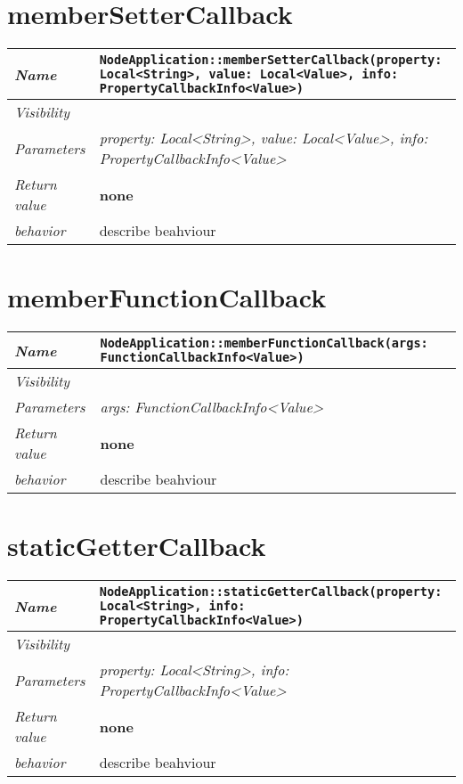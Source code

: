  \section{memberSetterCallback}
\begin{longtable}{p{3cm} @{\hskip 1cm} p{12cm}}
 \hline
\textit{Name} & \texttt{NodeApplication::memberSetterCallback(property: Local<String>, value: Local<Value>, info: PropertyCallbackInfo<Value>)}\\
\hline
 \textit{Visibility} & \\
\hline
\textit{Parameters} & \textit{property: Local<String>, value: Local<Value>, info: PropertyCallbackInfo<Value>}\\
\hline
\textit{Return value} & \textbf{none}\\
  \hline
 \textit{behavior} & describe beahviour \\
\hline
\end{longtable} \pagebreak
 \section{memberFunctionCallback}
\begin{longtable}{p{3cm} @{\hskip 1cm} p{12cm}}
 \hline
\textit{Name} & \texttt{NodeApplication::memberFunctionCallback(args: FunctionCallbackInfo<Value>)}\\
\hline
 \textit{Visibility} & \\
\hline
\textit{Parameters} & \textit{args: FunctionCallbackInfo<Value>}\\
\hline
\textit{Return value} & \textbf{none}\\
  \hline
 \textit{behavior} & describe beahviour \\
\hline
\end{longtable} \pagebreak
 \section{staticGetterCallback}
\begin{longtable}{p{3cm} @{\hskip 1cm} p{12cm}}
 \hline
\textit{Name} & \texttt{NodeApplication::staticGetterCallback(property: Local<String>, info: PropertyCallbackInfo<Value>)}\\
\hline
 \textit{Visibility} & \\
\hline
\textit{Parameters} & \textit{property: Local<String>, info: PropertyCallbackInfo<Value>}\\
\hline
\textit{Return value} & \textbf{none}\\
  \hline
 \textit{behavior} & describe beahviour \\
\hline
\end{longtable} \pagebreak
